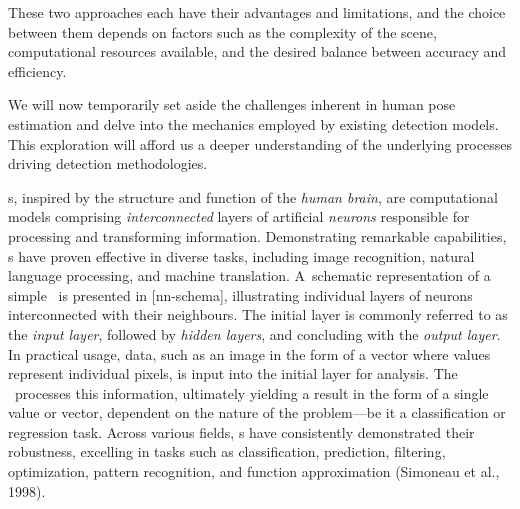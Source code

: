 These two approaches each have their advantages and limitations, and the choice between them depends on factors such as the complexity of the scene, computational resources available, and the desired balance between accuracy and efficiency.

We will now temporarily set aside the challenges inherent in human pose estimation and delve into the mechanics employed by existing detection models. This exploration will afford us a deeper understanding of the underlying processes driving detection methodologies.

\NN\-s, inspired by the structure and function of the {\em human brain}, are computational models comprising {\em interconnected} layers of artificial {\em neurons} responsible for processing and transforming information. Demonstrating remarkable capabilities, \NN\-s have proven effective in diverse tasks, including image recognition, natural language processing, and machine translation. A~schematic representation of a simple \NN\ is presented in [nn-schema], illustrating individual layers of neurons interconnected with their neighbours. The initial layer is commonly referred to as the {\em input layer}, followed by {\em hidden layers}, and concluding with the {\em output layer}. In practical usage, data, such as an image in the form of a vector where values represent individual pixels, is input into the initial layer for analysis. The \NN\ processes this information, ultimately yielding a result in the form of a single value or vector, dependent on the nature of the problem—be it a classification or regression task. Across various fields, \NN\-s have consistently demonstrated their robustness, excelling in tasks such as classification, prediction, filtering, optimization, pattern recognition, and function approximation (\scc Simoneau et al., 1998).


